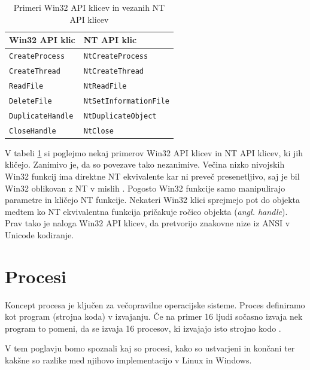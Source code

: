\documentclass[a4paper,12pt,openright]{book}
\begin{document}
\begin{table}[h!]
	\begin{center}
		\begin{tabular}{ l|l }
			Win32 API klic         & NT API klic                 \\
			\hline
			\verb|CreateProcess|   & \verb|NtCreateProcess|      \\
			\verb|CreateThread|    & \verb|NtCreateThread|       \\
			\verb|ReadFile|        & \verb|NtReadFile|           \\
			\verb|DeleteFile|      & \verb|NtSetInformationFile| \\
			\verb|DuplicateHandle| & \verb|NtDuplicateObject|    \\
			\verb|CloseHandle|     & \verb|NtClose|              \\
		\end{tabular}
	\end{center}
	\caption{Primeri Win32 API klicev in vezanih NT API klicev \cite{Tanenbaum_Bos_2023}}
	\label{tab:example_win32_nt_mapping}
\end{table}

V tabeli \ref{tab:example_win32_nt_mapping} si poglejmo nekaj primerov Win32 API klicev in NT API klicev, ki jih kličejo.
Zanimivo je, da so povezave tako nezanimive.
Večina nizko nivojskih Win32 funkcij ima direktne NT ekvivalente kar ni preveč presenetljivo, saj je bil Win32 oblikovan z NT v mislih \cite{Tanenbaum_Bos_2023}.
Pogosto Win32 funkcije samo manipulirajo parametre in kličejo NT funkcije.
Nekateri Win32 klici sprejmejo pot do objekta medtem ko NT ekvivalentna funkcija pričakuje ročico objekta (\textit{angl. handle}).
Prav tako je naloga Win32 API klicev, da pretvorijo znakovne nize iz ANSI v Unicode kodiranje.


\chapter{Procesi}

Koncept procesa je ključen za večopravilne operacijske sisteme.
Proces definiramo kot program (strojna koda) v izvajanju.
Če na primer 16 ljudi sočasno izvaja nek program to pomeni, da se izvaja 16 procesov, ki izvajajo isto strojno kodo \cite{Bovet_Cesati_2005}.

V tem poglavju bomo spoznali kaj so procesi, kako so ustvarjeni in končani ter kakšne so razlike med njihovo implementacijo v Linux in Windows.
\end{document}
